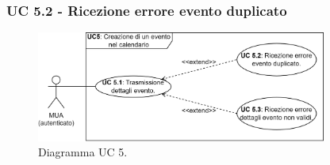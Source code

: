 \subsubsection{UC 5.2 - Ricezione errore evento duplicato} \label{sec:UC5.2}
    \begin{figure}[h]
        \includegraphics[width=0.85\textwidth]{sections/uc_imgs/UC05.X.png}
        \centering
        \caption{Diagramma UC 5.}
    \end{figure}
